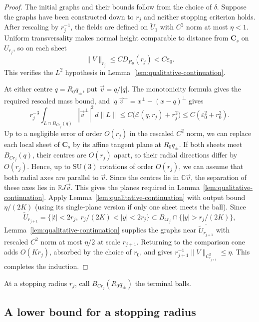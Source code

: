 \documentclass[11pt,a4paper]{article}
\numberwithin{equation}{section}
\theoremstyle{definition}
\theoremstyle{remark}
\begin{document}
	\begin{proof}
		The initial graphs and their bounds follow from the choice of $\delta$.
		Suppose the graphs have been constructed down to $r_j$ and neither
		stopping criterion holds. After rescaling by $r_j^{-1}$, the fields
		are defined on $\widetilde U_1$ with $C^2$ norm at most $\eta<1$.
		Uniform transversality makes normal height comparable to distance from
		$\mathbf C_s$ on $U_{r_j}$, so on each sheet
		\[
		\|V\|_{r_j}\le C D_{R_0}(r_j)<C\varepsilon_0.
		\]
		This verifies the $L^2$ hypothesis in
		Lemma~\ref{lem:qualitative-continuation}.
		
		At either centre $q=R_0q_\pm$, put $\vec v=q/|q|$.
		The monotonicity formula gives the required rescaled mass bound, and
		$|q|\vec v^\perp=x^\perp-(x-q)^\perp$ gives
		\[
		r_j^{-3}\int_{L\cap B_{Cr_j}(q)}|\vec v^\perp|^2\,d\|L\|
		\le C\bigl(\mathcal E(q,r_j)+r_j^2\bigr)
		\le C(\varepsilon_0^2+r_0^2).
		\]
		Up to a negligible error of order $O(r_j)$ in the rescaled $C^2$ norm,
		we can replace each local sheet of $\mathbf C_s$ by its affine tangent plane
		at $R_0q_\pm$.
		If both sheets meet $B_{Cr_j}(q)$, their centres are $O(r_j)$ apart,
		so their radial directions differ by $O(r_j)$.
		Hence, up to $\mathrm{SU}(3)$ rotations of order $O(r_j)$, we can
		assume that both radial axes are parallel to $\vec v$.
		Since the centres lie in $\mathbb C\vec v$, the separation of these axes
		lies in $\mathbb R J\vec v$.
		This gives the planes required in Lemma~\ref{lem:qualitative-continuation}.
		Apply Lemma~\ref{lem:qualitative-continuation} with output bound $\eta/(2K)$
		(using its single-plane version if only one sheet meets the ball).
		Since
		\[
		\widetilde U_{r_{j+1}}
		=\{|t|<2r_j,\ r_j/(2K)<|y|<2r_j\}
		\subset B_{4r_j}\cap\{|y|>r_j/(2K)\},
		\]
		Lemma~\ref{lem:qualitative-continuation} supplies the graphs near
		$\overline{\widetilde U_{r_{j+1}}}$ with rescaled $C^2$ norm at most
		$\eta/2$ at scale $r_{j+1}$.
		Returning to the comparison cone adds $O(Kr_j)$, absorbed by the
		choice of $r_0$, and gives
		$r_{j+1}^{-1}\|V\|_{C^2_{r_{j+1}}}\le\eta$.
		This completes the induction.
	\end{proof}
	
	At a stopping radius $r_j$, call
	$B_{Cr_j}(R_0q_\pm)$ the terminal balls.
	
	\subsection{A lower bound for a stopping radius}
	
\end{document}
